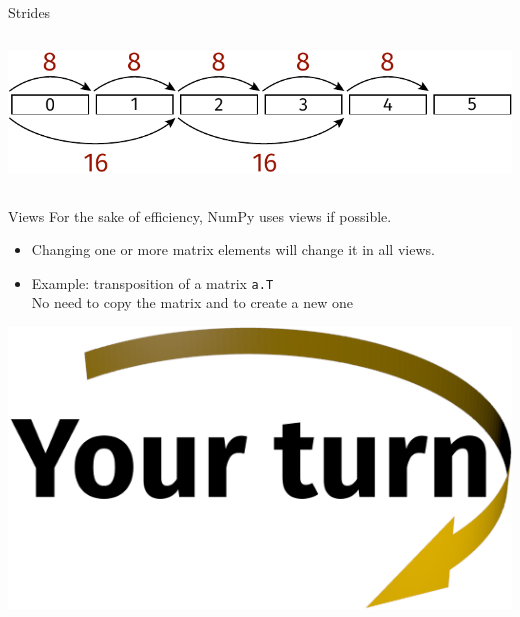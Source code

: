 \documentclass[svgnames]{beamer}
\begin{document}
\begin{frame}{Strides}
\begin{columns}
\begin{column}{0.67\textwidth}
   \vspace{0.2truecm}
   \includegraphics[width=\textwidth]{strides_2}
  \end{column}
 \end{columns}
\end{frame}

\begin{frame}{Views}
 For the sake of efficiency, NumPy uses views if possible.

 \begin{itemize}
  \item Changing one or more matrix elements will change it in all views.
  \item Example: transposition of a matrix \texttt{a.T}\\
        No need to copy the matrix and to create a new one
 \end{itemize}

 \begin{center}
  \includegraphics[width=3truecm]{yourturn}
 \end{center}
\end{frame}
\end{document}

